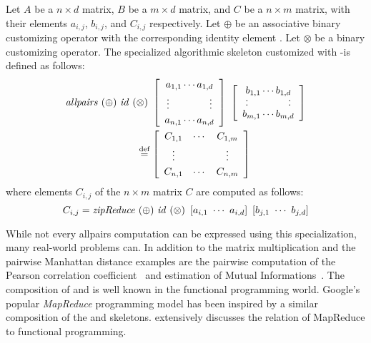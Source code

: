 \begin{definition}
  \label{def:allpairs:specialized}
  Let $A$ be a $n\times d$ matrix, $B$ be a $m\times d$ matrix, and $C$ be a $n\times m$ matrix, with their elements $a_{i,j}$, $b_{i,j}$, and $C_{i,j}$ respectively.
  Let $\oplus$ be an associative binary customizing operator with the corresponding identity element \id.
  Let $\otimes$ be a binary customizing operator.
  The specialized algorithmic skeleton \allpairs customized with \zip-\reduce is defined as follows:
  \begin{equation*}
    \begin{split}
      \allpairs\ (\oplus)\ \id\ (&\otimes)\ %
      \left[ \begin{array}{c} a_{1,1} \cdots a_{1,d}\\[.25em] \vdots \hspace{4em} \vdots\\[.25em] a_{n,1} \cdots a_{n,d} \end{array}\right]\ %
      \left[ \begin{array}{c} b_{1,1} \cdots b_{1,d}\\[-.25em] \cdot \hspace{4em} \cdot\\[-.75em] \cdot \hspace{4em} \cdot\\[-.25em] b_{m,1} \cdots b_{m,d} \end{array}\right]%
      \\
    &\eqdef \left[ \begin{array}{ccc} C_{1,1} & \cdots & C_{1,m}\\[.25em] \vdots & & \vdots\\[.25em] C_{n,1} & \cdots & C_{n,m} \end{array} \right]
    \end{split}
  \end{equation*}
  where elements $C_{i,j}$ of the $n\times m$ matrix $C$ are computed as follows:
  \[
    C_{i,j} = \text{\textit{zipReduce}}\ (\oplus)\ \text{\textit{id}}\ (\otimes)\ \left[a_{i,1}\ \cdots\ a_{i,d}\right]\ \left[b_{j,1}\ \cdots\ b_{j,d}\right]
  \]
\end{definition}


While not every allpairs computation can be expressed using this specialization, many real-world problems can.
In addition to the matrix multiplication and the pairwise Manhattan distance examples are the pairwise computation of the Pearson correlation coefficient~\cite{ChangDeQuRo2009} and estimation of Mutual Informations~\cite{DaubStSeKl2004}.
The composition of \zip and \reduce is well known in the functional programming world.
Google's popular \emph{MapReduce} programming model has been inspired by a similar composition of the \map and \reduce skeletons.
\cite{Laemmel2007} extensively discusses the relation of MapReduce to functional programming.



